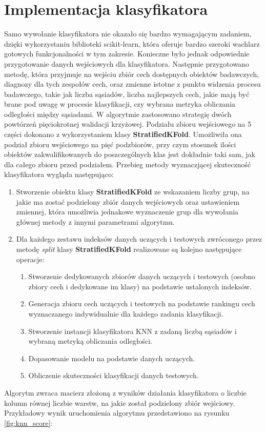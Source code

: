 \documentclass{article}
\begin{document}
\section{Implementacja klasyfikatora}
Samo wywołanie klasyfikatora nie okazało się bardzo wymagającym zadaniem, dzięki wykorzystaniu biblioteki scikit-learn, która oferuje bardzo szeroki wachlarz gotowych funkcjonalności w tym zakresie. Konieczne było jednak odpowiednie przygotowanie danych wejściowych dla klasyfikatora. Następnie przygotowano metodę, która przyjmuje na wejściu zbiór cech dostępnych obiektów badawczych, diagnozy dla tych zespołów cech, oraz zmienne istotne z punktu widzenia procesu badawczego, takie jak liczba sąsiadów, liczba najlepszych cech, jakie mają być brane pod uwagę w procesie klasyfikacji, czy wybrana metryka obliczania odległości między sąsiadami. W algorytmie zastosowano strategię dwóch powtórzeń pięciokrotnej walidacji krzyżowej. Podziału zbioru wejściowego na 5 części dokonano z wykorzystaniem klasy \textbf{StratifiedKFold}. Umożliwiła ona podział zbioru wejściowego na pięć podzbiorów, przy czym stosunek ilości obiektów zakwalifikowanych do poszczególnych klas jest dokładnie taki sam, jak dla całego zbioru przed podziałem. Przebieg metody wyznaczjącej skuteczność klasyfikatora wygląda następująco:
\begin{enumerate}
    \item Stworzenie obiektu klasy \textbf{StratifiedKFold} ze wskazaniem liczby grup, na jakie ma zostać podzielony zbiór danych wejściowych oraz ustawieniem zmiennej, która umożliwia jednakowe wyznaczenie grup dla wywołania głównej metody z innymi parametrami algorytmu.
    \item Dla każdego zestawu indeksów danych uczących i testowych zwróconego przez metodę \textit{split} klasy \textbf{StratifiedKFold} realizowane są kolejno następujące operacje:
        \begin{enumerate}
            \item Stworzenie dedykowanych zbiorów danych uczących i testowych (osobno zbiory cech i dedykowane im klasy) na podstawie ustalonych indeksów.
            \item Generacja zbioru cech uczących i testowych na podstawie rankingu cech wyznaczanego indywidualnie dla każdego zadania klasyfikacji.
            \item Stworzenie instancji klasyfikatora KNN z zadaną liczbą sąsiadów i wybraną metryką obliczania odległości.
            \item Dopasowanie modelu na podstawie danych uczących.
            \item Obliczenie skuteczności klasyfikacji danych testowych.
        \end{enumerate}
\end{enumerate}
Algorytm zwraca macierz złożoną z wyników działania klasyfikatora o liczbie kolumn równej liczbie warstw, na jakie został podzielony zbiór wejściowy.\\
Przykładowy wynik uruchomienia algorytmu przedstawiono na rysunku \ref{fig:knn_score}:
\end{document}
